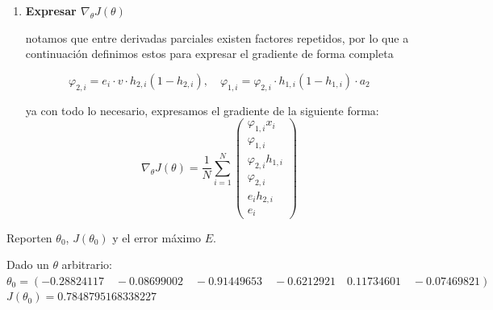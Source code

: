 \documentclass{article}
\begin{document}
\begin{enumerate}[label=\roman*]
\begin{enumerate}[label=\arabic*.]
    \item derivada parcial respecto a $v$

    $v \longrightarrow \hat{y}_i \longrightarrow L_i$

    \[
    L_i = \frac{1}{2}(c+v \cdot h_{2,i} - y_i)^2
    \quad\Rightarrow\quad
    \frac{\partial L_i}{\partial v}
    = ((c+v \cdot h_{2,i} - y_i)h_{2,i})
    \;=\;(e_i \cdot h_{2,i})
    \]

    \item derivada parcial respecto a $c$
    
    $c \longrightarrow \hat{y}_i \longrightarrow L_i$

    \[
      L_i = \frac{1}{2}(c+v \cdot h_{2,i} - y_i)^2
      \quad\Rightarrow\quad
      \frac{\partial L_i}{\partial c}
      = (c+v \cdot h_{2,i} - y_i)
      \;=\;(e_i)
      \]
  \end{enumerate}

  \item \textbf{Expresar $\nabla_\theta J(\theta)$}
  
  notamos que entre derivadas parciales existen factores repetidos,
  por lo que a continuación definimos estos para expresar el gradiente de forma completa
    
    \[
  \varphi_{2,i} = e_i \cdot v \cdot h_{2,i}(1-h_{2,i}) ,
  \quad
  \varphi_{1,i} = \varphi_{2,i} \cdot h_{1,i}(1-h_{1,i}) \cdot a_2
  \]

  ya con todo lo necesario, expresamos el gradiente de la siguiente forma:
  \[
  \nabla_\theta J(\theta) = \frac{1}{N}\sum_{i=1}^{N}
  \begin{pmatrix}
    \varphi_{1,i}x_i \\
    \varphi_{1,i} \\
    \varphi_{2,i}h_{1,i} \\
    \varphi_{2,i} \\
    e_ih_{2,i} \\
    e_i
    \end{pmatrix}
    \]

\end{enumerate}

  
  Reporten $\theta_0$, $J(\theta_0)$ y el error máximo $E$.
  
  Dado un $\theta$ arbitrario:\\
  $\theta_0 = (-0.28824117\quad -0.08699002\quad  -0.91449653\quad -0.6212921\quad   0.11734601\quad -0.07469821)$\\
  $J(\theta_0) = 0.7848795168338227$
\end{document}
